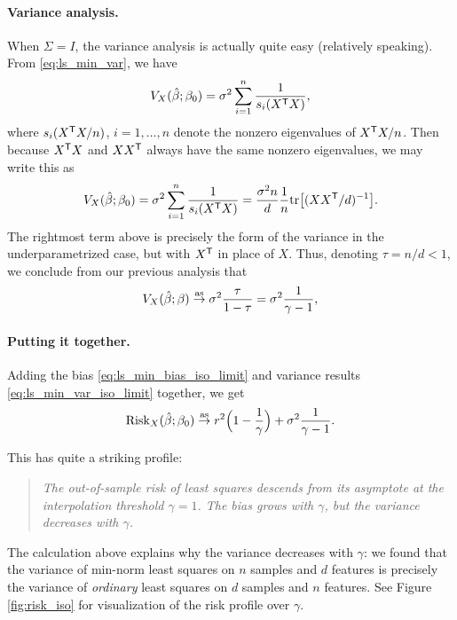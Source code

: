 \documentclass{article}
\begin{document}
\paragraph{Variance analysis.}

When $\Sigma = I$, the variance analysis is actually quite easy (relatively
speaking). From \eqref{eq:ls_min_var}, we have
\[
V_X(\hat{\beta}; \beta_0) = \sigma^2 \sum_{i=1}^n \frac{1}{s_i(X^{\mathsf{T}} X)},
\]
where $s_i(X^{\mathsf{T}} X/n)$, $i=1,\dots,n$ denote the nonzero eigenvalues of $X^{\mathsf{T}} 
X/n$. Then because $X^{\mathsf{T}} X$ and $XX^{\mathsf{T}}$ always have the same nonzero
eigenvalues, we may write this as
\[
V_X(\hat{\beta}; \beta_0) = \sigma^2 \sum_{i=1}^n \frac{1}{s_i(X^{\mathsf{T}} X)} = 
\frac{\sigma^2 n}{d} \frac{1}{n} \mathrm{tr}\big[ (XX^{\mathsf{T}} /d)^{-1} \big].
\]
The rightmost term above is precisely the form of the variance in the
underparametrized case, but with $X^{\mathsf{T}}$ in place of $X$. Thus, denoting $\tau =
n/d < 1$, we conclude from our previous analysis that  
\begin{equation}
\label{eq:ls_min_var_iso_limit}
V_X(\hat{\beta}; \beta) \overset{\mathrm{as}}{\to} \sigma^2 \frac{\tau}{1-\tau} = \sigma^2 
\frac{1}{\gamma-1},  
\end{equation}

\paragraph{Putting it together.}

Adding the bias \eqref{eq:ls_min_bias_iso_limit} and variance results
\eqref{eq:ls_min_var_iso_limit} together, we get
\begin{equation}
\label{eq:ls_min_risk_iso_limit}
\mathrm{Risk}_X(\hat{\beta}; \beta_0) \overset{\mathrm{as}}{\to} r^2 \Big( 1- \frac{1}{\gamma} \Big) + \sigma^2 
\frac{1}{\gamma-1}. 
\end{equation}

This has quite a striking profile:
\begin{quote}
\centering\it
The out-of-sample risk of least squares descends from its asymptote at the
interpolation threshold $\gamma = 1$. The bias grows with $\gamma$, but 
the variance decreases with $\gamma$.      
\end{quote}
The calculation above explains why the variance decreases with $\gamma$: we
found that the variance of min-norm least squares on $n$ samples and $d$
features is precisely the variance of \emph{ordinary} least squares on $d$
samples and $n$ features. See Figure \ref{fig:risk_iso} for visualization of the
risk profile over $\gamma$.
\end{document}
